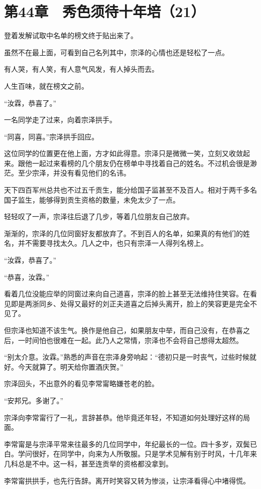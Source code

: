 \section{第44章　秀色须待十年培（21）}

登着发解试取中名单的榜文终于贴出来了。

虽然不在最上面，可看到自己名列其中，宗泽的心情也还是轻松了一点。

有人哭，有人笑，有人意气风发，有人掉头而去。

人生百味，就在榜文之前。

“汝霖，恭喜了。”

一名同学走了过来，向着宗泽拱手。

“同喜，同喜。”宗泽拱手回应。

这位同学的位置更在他上面，方才如此得意。宗泽只是微微一笑，立刻又收敛起来。跟他一起过来看榜的几个朋友仍在榜单中寻找着自己的姓名。不过机会很是渺茫。至少宗泽，并没有看见他们的名讳。

天下四百军州总共也不过五千贡生，能分给国子监甚至不及百人。相对于两千多名国子监生，能够得到贡生资格的数量，未免太少了一点。

轻轻叹了一声，宗泽往后退了几步，等着几位朋友自己放弃。

渐渐的，宗泽的几位同窗好友都放弃了。不到百人的名单，如果真的有他们的姓名，并不需要寻找太久。几人之中，也只有宗泽一人得列名榜上。

“汝霖，恭喜了。”

“恭喜，汝霖。”

看着几位没能应举的同窗过来向自己道喜，宗泽的脸上甚至无法维持住笑容。在看见即是两浙同乡、处得又最好的刘正夫道喜之后掉头离开，脸上的笑容更是完全不见了。

但宗泽也知道不该生气。换作是他自己，如果朋友中举，而自己没有，在恭喜之后，一时间怕也很难在一起。此乃人之常情，宗泽也不会将自己想得太超然。

“别太介意。汝霖。”熟悉的声音在宗泽身旁响起：“德初只是一时丧气，过些时候就好。今天就算了。明天给你置酒庆贺。”

宗泽回头，不出意外的看见李常甯略嫌苍老的脸。

“安邦兄。多谢了。”

宗泽向李常甯行了一礼，言辞甚恭。他毕竟还年轻，不知道如何处理好这样的局面。

李常甯是与宗泽平常来往最多的几位同学中，年纪最长的一位。四十多岁，双鬓已白。学问很好，在同学中，向来为人所敬服。只是学术见解有别于时风，十几年来几科总是不中。这一科，甚至连贡举的资格都没拿到。

李常甯拱拱手，也先行告辞。离开时笑容又转为惨淡，让宗泽看得心中堵得慌。

